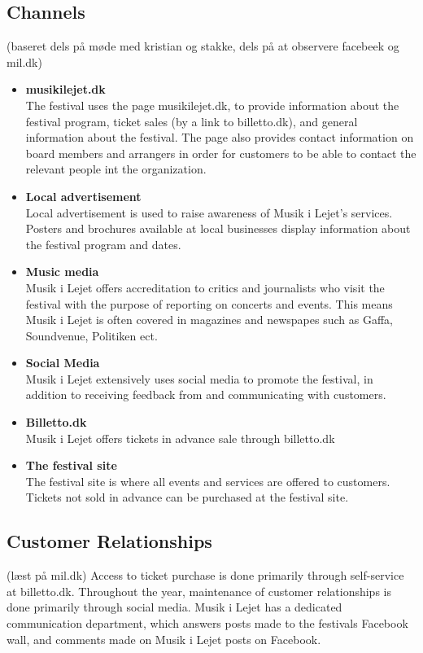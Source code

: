 \subsection{Channels} %
\label{sub:channels}
(baseret dels på møde med kristian og stakke, dels på at observere facebeek og mil.dk)
\begin{itemize}
	\item \textbf{musikilejet.dk}\\
		The festival uses the page musikilejet.dk, to provide information about the festival program, ticket sales (by a link to billetto.dk), and general information about the festival. The page also provides contact information on board members and arrangers in order for customers to be able to contact the relevant people int the organization.
	\item \textbf{Local advertisement}\\
		Local advertisement is used to raise awareness of Musik i Lejet's services. Posters and brochures available at local businesses display information about the festival program and dates.
	\item \textbf{Music media}\\
		Musik i Lejet offers accreditation to critics and journalists who visit the festival with the purpose of reporting on concerts and events. This means Musik i Lejet is often covered in magazines and newspapes such as Gaffa, Soundvenue, Politiken ect.
	\item \textbf{Social Media}\\
		Musik i Lejet extensively uses social media to promote the festival, in addition to receiving feedback from and communicating with customers.
	\item \textbf{Billetto.dk}\\
		Musik i Lejet offers tickets in advance sale through billetto.dk
	\item \textbf{The festival site}\\
		The festival site is where all events and services are offered to customers. Tickets not sold in advance can be purchased at the festival site.
\end{itemize}
\subsection{Customer Relationships} %
\label{sub:customer_relationships}
(læst på mil.dk)
Access to ticket purchase is done primarily through self-service at billetto.dk. Throughout the year, maintenance of customer relationships is done primarily through social media. Musik i Lejet has a dedicated communication department, which answers posts made to the festivals Facebook wall, and comments made on Musik i Lejet posts on Facebook.

